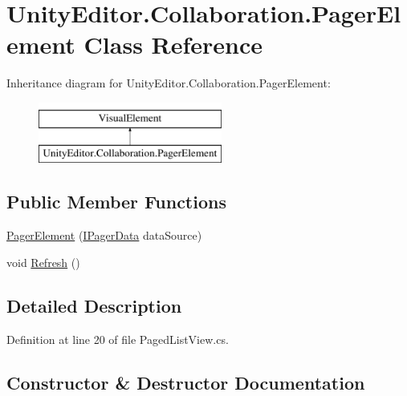 \hypertarget{class_unity_editor_1_1_collaboration_1_1_pager_element}{}\section{Unity\+Editor.\+Collaboration.\+Pager\+Element Class Reference}
\label{class_unity_editor_1_1_collaboration_1_1_pager_element}
Inheritance diagram for Unity\+Editor.\+Collaboration.\+Pager\+Element\+:\begin{figure}[H]
\begin{center}
\leavevmode
\includegraphics[height=2.000000cm]{class_unity_editor_1_1_collaboration_1_1_pager_element}
\end{center}
\end{figure}
\subsection*{Public Member Functions}
\begin{DoxyCompactItemize}
\item 
\mbox{\hyperlink{class_unity_editor_1_1_collaboration_1_1_pager_element_aac8cf3ead3380c924c7c841971f00669}{Pager\+Element}} (\mbox{\hyperlink{interface_unity_editor_1_1_collaboration_1_1_i_pager_data}{I\+Pager\+Data}} data\+Source)
\item 
void \mbox{\hyperlink{class_unity_editor_1_1_collaboration_1_1_pager_element_ab4fc6ec40f8765378abab836cd4c03f9}{Refresh}} ()
\end{DoxyCompactItemize}


\subsection{Detailed Description}


Definition at line 20 of file Paged\+List\+View.\+cs.



\subsection{Constructor \& Destructor Documentation}
\mbox{\label{class_unity_editor_1_1_collaboration_1_1_pager_element_aac8cf3ead3380c924c7c841971f00669}} 
